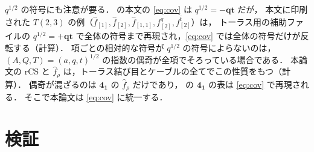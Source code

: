 \documentclass[11pt,a4paper]{ltjsarticle}
\theoremstyle{definition}
\theoremstyle{remark}
\newcommand{\bq}{\mathbf{q}}
\newcommand{\bt}{\mathbf{t}}
\newcommand{\hf}{\widehat{f}}
\begin{document}
$q^{1/2}$ の符号にも注意が要る．\cite{KN} の本文の \eqref{eq:cov} は $q^{1/2}=-\bq\bt$ だが，
本文に印刷された $T(2,3)$ の例（$\hf_{[1]},\hf_{[2]},\hf_{[1,1]},f^q_{[2]},f^{\bar t}_{[2]}$）は，
トーラス用の補助ファイルの $q^{1/2}=+\bq\bt$ で全体の符号まで再現され，\eqref{eq:cov} では全体の符号だけが反転する（計算）．
項ごとの相対的な符号が $q^{1/2}$ の符号によらないのは，$(A,Q,T)=(a,q,t)^{1/2}$ の指数の偶奇が全項でそろっている場合である．
本論文の rCS と $\hf_\rho$ は，トーラス結び目とケーブルの全てでこの性質をもつ（計算）．
偶奇が混ざるのは $\mathbf{4_1}$ の $\hf_\rho$ だけであり，\cite{KN} の $\mathbf{4_1}$ の表は \eqref{eq:cov} で再現される．
そこで本論文は \eqref{eq:cov} に統一する．

\section{検証}\label{sec:checks}
\end{document}
